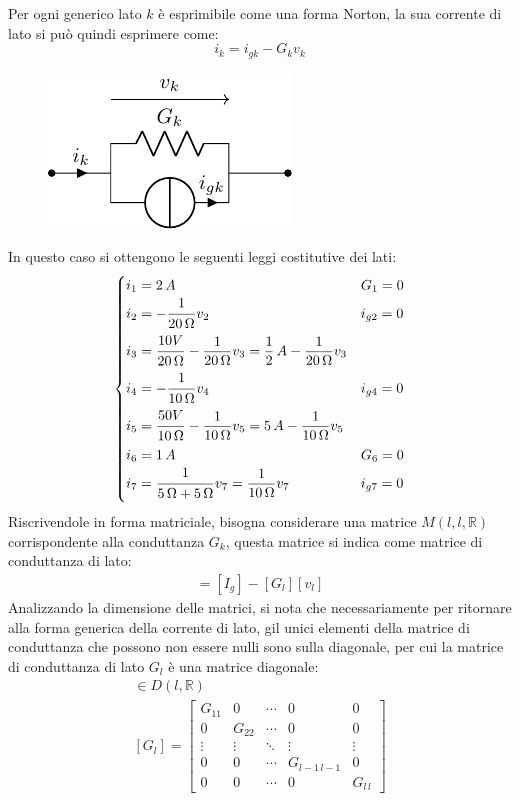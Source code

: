 \documentclass{article}
\numberwithin{equation}{subsection}
\begin{document}
Per ogni generico lato $k$ è esprimibile come una forma Norton, la sua corrente di lato si può quindi esprimere come:
\begin{equation*}
    i_k=i_{gk}-G_kv_k
\end{equation*}
\begin{figure}[H]%
    \centering
    \includegraphics{lato-norton-generico.pdf}
    \label{fig:lato-norton-generico}
\end{figure}
In questo caso si ottengono le seguenti leggi costitutive dei lati:
\begin{equation*}
    \begin{cases}
        i_1=2\,A&G_1=0\\
        i_2=\displaystyle-\frac{\strut 1}{\strut 20\,\Omega}v_2&i_{g2}=0\\
        i_3=\displaystyle\frac{\strut 10V}{\strut 20\,\Omega}-\frac{1}{20\,\Omega}v_3=\frac{1}{2}\,A-\frac{1}{20\,\Omega}v_3\\
        i_4=\displaystyle-\frac{\strut 1}{\strut 10\,\Omega}v_4 &i_{g4}=0\\
        i_5=\displaystyle\frac{\strut 50V}{\strut 10\,\Omega}-\frac{1}{10\,\Omega}v_5=5\,A-\displaystyle\frac{1}{10\,\Omega}v_5\\
        i_6=1\,A &G_6=0\\
        i_7=\displaystyle\frac{\strut 1}{\strut 5\,\Omega+5\,\Omega}v_7=\frac{1}{10\,\Omega}v_7
        &i_{g7}=0
    \end{cases}
\end{equation*}
Riscrivendole in forma matriciale, bisogna considerare una matrice $M(l,l,\mathbb{R})$ corrispondente alla conduttanza $G_k$, questa matrice si indica come matrice di 
conduttanza di lato: 
\begin{gather*}
    [i_l]=[I_g]-[G_l][v_l]
\end{gather*}
Analizzando la dimensione delle matrici, si nota che necessariamente per ritornare alla forma generica della corrente di lato, gil unici elementi della matrice di 
conduttanza che possono non essere nulli sono sulla diagonale, per cui la matrice di conduttanza di lato $G_l$ è una matrice diagonale:
\begin{gather*}
    [G_l]\in D(l,\mathbb{R})\\
    [G_l]=\begin{bmatrix}
        G_{11}&0&\cdots&0&0\\
        0&G_{22}&\cdots&0&0\\
        \vdots&\vdots&\ddots&\vdots&\vdots\\
        0&0&\cdots&G_{l-1\,l-1}&0\\
        0&0&\cdots&0&G_{l\,l}
    \end{bmatrix}
\end{gather*}
\end{document}
